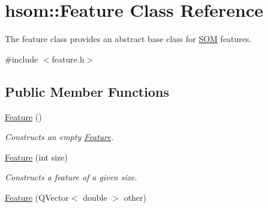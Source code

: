 \hypertarget{classhsom_1_1_feature}{\section{hsom\-:\-:\-Feature \-Class \-Reference}
\label{classhsom_1_1_feature}
}


\-The feature class provides an abstract base class for \hyperlink{classhsom_1_1_s_o_m}{\-S\-O\-M} features.  




{\ttfamily \#include $<$feature.\-h$>$}

\subsection*{\-Public \-Member \-Functions}
\begin{DoxyCompactItemize}
\item 
\hypertarget{classhsom_1_1_feature_a0796b38e45a905c0e4ddebea0707659d}{\hyperlink{classhsom_1_1_feature_a0796b38e45a905c0e4ddebea0707659d}{\-Feature} ()}\label{classhsom_1_1_feature_a0796b38e45a905c0e4ddebea0707659d}

\begin{DoxyCompactList}\small\item\em \-Constructs an empty \hyperlink{classhsom_1_1_feature}{\-Feature}. \end{DoxyCompactList}\item 
\hypertarget{classhsom_1_1_feature_a11b0bacfcbcc239314d831f674922d4c}{\hyperlink{classhsom_1_1_feature_a11b0bacfcbcc239314d831f674922d4c}{\-Feature} (int size)}\label{classhsom_1_1_feature_a11b0bacfcbcc239314d831f674922d4c}

\begin{DoxyCompactList}\small\item\em \-Constructs a feature of a given size. \end{DoxyCompactList}\item 
\hypertarget{classhsom_1_1_feature_a2b913a37bf2e351ab4157bbcfaac356d}{\hyperlink{classhsom_1_1_feature_a2b913a37bf2e351ab4157bbcfaac356d}{\-Feature} (\-Q\-Vector$<$ double $>$ other)}\label{classhsom_1_1_feature_a2b913a37bf2e351ab4157bbcfaac356d}


\end{DoxyCompactItemize}
